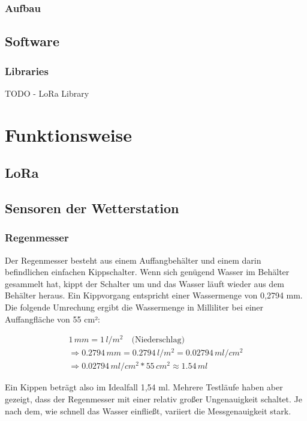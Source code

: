 \documentclass{article}
\begin{document}
      \subsubsection{Aufbau}

    \subsection{Software}

      \subsubsection{Libraries}
    
      TODO - LoRa Library

  \section{Funktionsweise}

    \subsection{LoRa}

    \subsection{Sensoren der Wetterstation}

      \subsubsection{Regenmesser}

        Der Regenmesser besteht aus einem Auffangbehälter und einem darin befindlichen einfachen Kippschalter.
        Wenn sich genügend Wasser im Behälter gesammelt hat, kippt der Schalter um und das Wasser läuft wieder aus dem Behälter heraus.
        Ein Kippvorgang entspricht einer Wassermenge von 0,2794 mm.
        Die folgende Umrechung ergibt die Wassermenge in Milliliter bei einer Auffangfläche von 55 cm²:

        \begin{multline}
          1\,mm = 1\,l/m^2 \quad \text{(Niederschlag)} \\
          \Rightarrow 0.2794\,mm = 0.2794\,l/m^2 = 0.02794\,ml/cm^2 \\
          \Rightarrow 0.02794\,ml/cm^2 * 55\,cm^2 \approx 1.54\,ml
        \end{multline}

        Ein Kippen beträgt also im Idealfall 1,54 ml. Mehrere Testläufe haben aber gezeigt, dass der Regenmesser mit einer relativ großer Ungenauigkeit schaltet.
        Je nach dem, wie schnell das Wasser einfließt, variiert die Messgenauigkeit stark.
\end{document}
